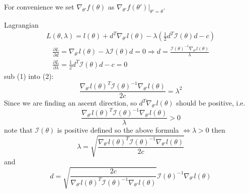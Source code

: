 \begin{answer}
For convenience we set $ \nabla_{\theta'}f(\theta) $ as $ \nabla_{\theta'}f(\theta')|_{\theta' = \theta} $.

Lagrangian
\begin{align*}
 L(\theta, \lambda) = l(\theta) + d^T\nabla_{\theta'}l(\theta) - \lambda(\frac{1}{2}d^T\mathcal{I}(\theta)d - c) 
 \end{align*}
 \begin{align}
 \frac{\partial L}{\partial d} = \nabla_{\theta'}l(\theta) - \lambda\mathcal{I}(\theta)d = 0 \Rightarrow
 d = \frac{ \mathcal{I}(\theta)^{-1}\nabla_{\theta'}l(\theta)}{\lambda} \\ 
 \frac{\partial L}{\partial \lambda} = \frac{1}{2}d^T\mathcal{I}(\theta)d - c = 0
\end{align}
sub (1) into (2):
\[ \frac{\nabla_{\theta'}l(\theta)^T\mathcal{I}(\theta)^{-1}\nabla_{\theta'}l(\theta)}{2c} = \lambda^2 \]
Since we are finding an ascent direction, so $ d^T\nabla_{\theta'}l(\theta) $ should be positive, i.e.  \[ \frac{\nabla_{\theta'}l(\theta)^T\mathcal{I}(\theta)^{-1}\nabla_{\theta'}l(\theta)}{\lambda} > 0  \]
note that $ \mathcal{I}(\theta) $ is positive defined so the above formula $ \Leftrightarrow \lambda > 0 $
then
\[ \lambda = \sqrt{\frac{\nabla_{\theta'}l(\theta)^T\mathcal{I}(\theta)^{-1}\nabla_{\theta'}l(\theta)}{2c}}  \]
and 
\[ d = \sqrt{\frac{2c}{\nabla_{\theta'}l(\theta)^T\mathcal{I}(\theta)^{-1}\nabla_{\theta'}l(\theta)}}\mathcal{I}(\theta)^{-1}\nabla_{\theta'}l(\theta) \]


 \end{answer}
